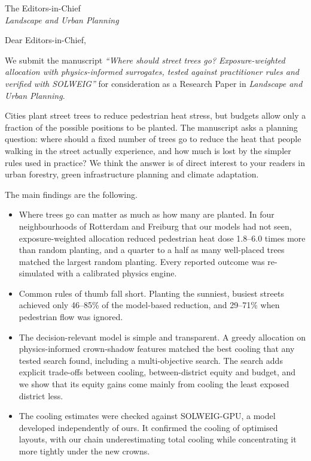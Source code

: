 \documentclass[11pt]{letter}
\date{25 November 2026}
\begin{document}
\begin{letter}{The Editors-in-Chief\\\emph{Landscape and Urban Planning}}

\opening{Dear Editors-in-Chief,}

We submit the manuscript \emph{``Where should street trees go? Exposure-weighted allocation with physics-informed surrogates, tested against practitioner rules and verified with SOLWEIG''} for consideration as a Research Paper in \emph{Landscape and Urban Planning}.

Cities plant street trees to reduce pedestrian heat stress, but budgets allow only a fraction of the possible positions to be planted. The manuscript asks a planning question: where should a fixed number of trees go to reduce the heat that people walking in the street actually experience, and how much is lost by the simpler rules used in practice? We think the answer is of direct interest to your readers in urban forestry, green infrastructure planning and climate adaptation.

The main findings are the following.
\begin{itemize}
  \item Where trees go can matter as much as how many are planted. In four neighbourhoods of Rotterdam and Freiburg that our models had not seen, exposure-weighted allocation reduced pedestrian heat dose 1.8--6.0 times more than random planting, and a quarter to a half as many well-placed trees matched the largest random planting. Every reported outcome was re-simulated with a calibrated physics engine.
  \item Common rules of thumb fall short. Planting the sunniest, busiest streets achieved only 46--85\% of the model-based reduction, and 29--71\% when pedestrian flow was ignored.
  \item The decision-relevant model is simple and transparent. A greedy allocation on physics-informed crown-shadow features matched the best cooling that any tested search found, including a multi-objective search. The search adds explicit trade-offs between cooling, between-district equity and budget, and we show that its equity gains come mainly from cooling the least exposed district less.
  \item The cooling estimates were checked against SOLWEIG-GPU, a model developed independently of ours. It confirmed the cooling of optimised layouts, with our chain underestimating total cooling while concentrating it more tightly under the new crowns.
\end{itemize}


\end{letter}
\end{document}
